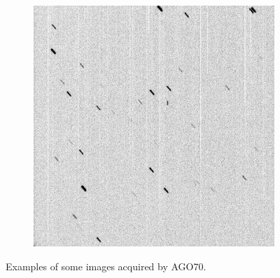 \begin{figure}[!h]
\begin{subfigure}{.3\textwidth}
    \end{subfigure}
    \hfill
    \begin{subfigure}{.3\textwidth}
        \centering
        \includegraphics[width=\textwidth]{images/StreakStreak2.jpg}
    \end{subfigure}
    \hfill
    \caption{Examples of some images acquired by AGO70. }
    \label{fig:ago70images}
\end{figure}


